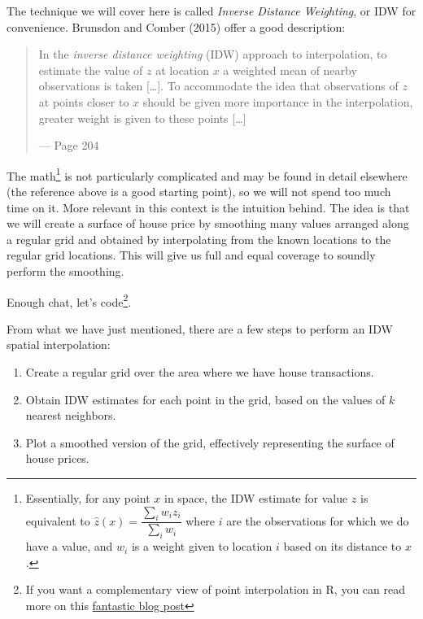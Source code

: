 \documentclass[
  letterpaper,
  krantz2]{style/krantz}
\providecommand{\tightlist}{%
  \setlength{\itemsep}{0pt}\setlength{\parskip}{0pt}}\usepackage{longtable,booktabs,array}
\begin{document}
The technique we will cover here is called \emph{Inverse Distance
Weighting}, or IDW for convenience. Brunsdon and Comber (2015) offer a
good description:

\begin{quote}
In the \emph{inverse distance weighting} (IDW) approach to
interpolation, to estimate the value of \(z\) at location \(x\) a
weighted mean of nearby observations is taken {[}\ldots{]}. To
accommodate the idea that observations of \(z\) at points closer to
\(x\) should be given more importance in the interpolation, greater
weight is given to these points {[}\ldots{]}

--- Page 204
\end{quote}

The math\footnote{Essentially, for any point \(x\) in space, the IDW
  estimate for value \(z\) is equivalent to
  \(\hat{z} (x) = \dfrac{\sum_i w_i z_i}{\sum_i w_i}\) where \(i\) are
  the observations for which we do have a value, and \(w_i\) is a weight
  given to location \(i\) based on its distance to \(x\).} is not
particularly complicated and may be found in detail elsewhere (the
reference above is a good starting point), so we will not spend too much
time on it. More relevant in this context is the intuition behind. The
idea is that we will create a surface of house price by smoothing many
values arranged along a regular grid and obtained by interpolating from
the known locations to the regular grid locations. This will give us
full and equal coverage to soundly perform the smoothing.

Enough chat, let's code\footnote{If you want a complementary view of
  point interpolation in R, you can read more on this
  \href{https://swilke-geoscience.net/post/2020-09-10-kriging_with_r/kriging/}{fantastic
  blog post}}.

From what we have just mentioned, there are a few steps to perform an
IDW spatial interpolation:

\begin{enumerate}
\def\labelenumi{\arabic{enumi}.}
\tightlist
\item
  Create a regular grid over the area where we have house transactions.
\item
  Obtain IDW estimates for each point in the grid, based on the values
  of \(k\) nearest neighbors.
\item
  Plot a smoothed version of the grid, effectively representing the
  surface of house prices.
\end{enumerate}
\end{document}
